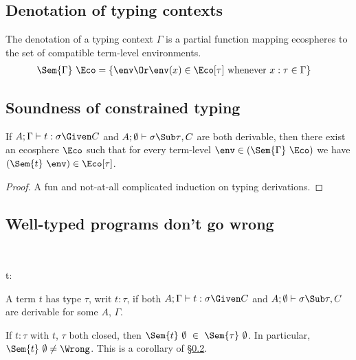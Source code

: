 \documentclass{amsart}
\theoremstyle{definition}
\begin{document}
\subsection{Denotation of typing contexts}
The denotation of a typing context $\Gamma$ is a partial function
mapping ecospheres to the set of compatible
term-level environments.
\begin{align*}
\Sem{\Gamma}~\Eco&=
\left\{\env \Or
\env(x)\in\Eco[\tau]\text{ whenever }x:\tau\in\Gamma
\right\}
\end{align*}

\subsection{Soundness of constrained typing}
\label{consound}
If
$A;\Gamma\vdash t : \sigma\Given C$ and
$A;\emptyset\vdash{\sigma\Sub\tau},C$
are both derivable, then there exist an ecosphere $\Eco$ such
that for every term-level $\env\in(\Sem{\Gamma}~\Eco)$ we have
$(\Sem{t}~\env)\in\Eco[\tau]$.

\begin{proof}
A fun and not-at-all complicated induction on typing derivations.
\end{proof}

\subsection{Well-typed programs don't go wrong}~

{t:\tau}

A term $t$ has type $\tau$, writ $t:\tau$, if both
$A;\Gamma\vdash t : \sigma\Given C$ and
$A;\emptyset\vdash\sigma\Sub\tau,C$ are derivable for some $A$,
$\Gamma$.

If $t:\tau$ with $t$, $\tau$ both closed, then
$\Sem{t}~\emptyset~\in~\Sem{\tau}~\emptyset$. In particular,
$\Sem{t}~\emptyset\neq\Wrong$. This is a corollary of
\S\ref{consound}.




\end{document}
